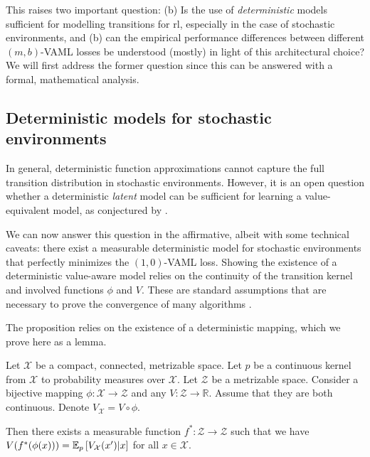 This raises two important question: (b) Is the use of \emph{deterministic} models sufficient for modelling transitions for \ac{rl}, especially in the case of stochastic environments, and (b) can the empirical performance differences between different $(m,b)$-VAML losses be understood (mostly) in light of this architectural choice?
We will first address the former question since this can be answered with a formal, mathematical analysis. 

\subsection{Deterministic models for stochastic environments}
\label{sec:cvaml:theory_2}

In general, deterministic function approximations cannot capture the full transition distribution in stochastic environments.
However, it is an open question whether a deterministic \emph{latent} model can be sufficient for learning a value-equivalent model, as conjectured by \textcite{oh2017value}.

We can now answer this question in the affirmative, albeit with some technical caveats: there exist a measurable deterministic model for stochastic environments that perfectly minimizes the $(1,0)$-VAML loss.
Showing the existence of a deterministic value-aware model relies on the continuity of the transition kernel and involved functions $\phi$ and $V$.
These are standard assumptions that are necessary to prove the convergence of many algorithms \parencite{bertsekasshreve1978}. 


The proposition relies on the existence of a deterministic mapping, which we prove here as a lemma.


\begin{lemma}
\label{lem:cvaml:deterministic_representation_lemma}
    Let $\mathcal{X}$ be a compact, connected, metrizable space. Let $p$ be a continuous kernel from $\mathcal{X}$ to probability measures over $\mathcal{X}$. Let $\mathcal{Z}$ be a metrizable space. Consider a bijective mapping $\phi: \mathcal{X} \rightarrow \mathcal{Z}$ and any $V: \mathcal{Z} \rightarrow \mathbb{R}$. Assume that they are both continuous. Denote $V_\mathcal{X} = V \circ \phi$.
    
    Then there exists a measurable function $f^*: \mathcal{Z} \rightarrow \mathcal{Z}$ such that we have $V(f^*(\phi(x))) = \mathbb{E}_{p}\left[  V_\mathcal{X}(x')|x \right]$ for all $x \in \mathcal{X}$.
\end{lemma}

